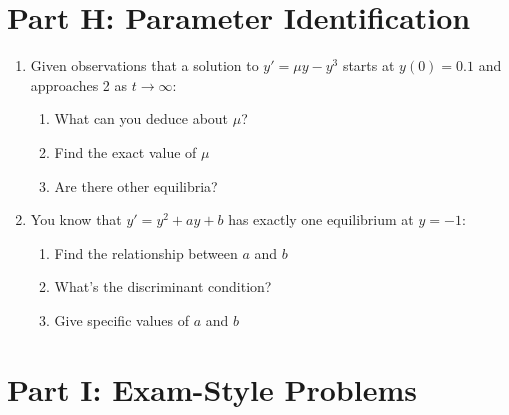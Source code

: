\documentclass[12pt]{article}
\begin{document}
\section*{Part H: Parameter Identification}

\begin{enumerate}[start=21]
    \item Given observations that a solution to $y' = \mu y - y^3$ starts at $y(0) = 0.1$ and approaches 2 as $t \to \infty$:
    \begin{enumerate}[label=(\alph*)]
        \item What can you deduce about $\mu$?
        \item Find the exact value of $\mu$
        \item Are there other equilibria?
    \end{enumerate}
    
    \item You know that $y' = y^2 + ay + b$ has exactly one equilibrium at $y = -1$:
    \begin{enumerate}[label=(\alph*)]
        \item Find the relationship between $a$ and $b$
        \item What's the discriminant condition?
        \item Give specific values of $a$ and $b$
    \end{enumerate}
\end{enumerate}

\section*{Part I: Exam-Style Problems}
\end{document}
